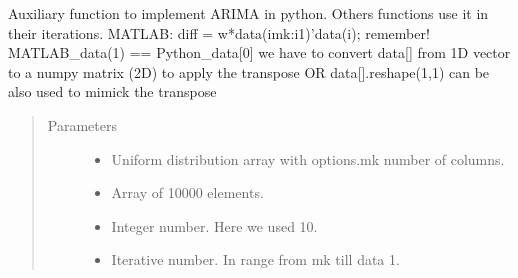 \documentclass[letterpaper,10pt,english]{sphinxmanual}
\begin{document}

\begin{fulllineitems}
\label{\detokenize{LDS:LDS.OnlineLDS_library.diff_calc}}
\sphinxAtStartPar
Auxiliary function to implement ARIMA in python. Others functions use it in their
iterations.
MATLAB: diff = w*data(i\sphinxhyphen{}mk:i\sphinxhyphen{}1)’\sphinxhyphen{}data(i);
remember! MATLAB\_data(1) == Python\_data{[}0{]}
we have to convert data{[}{]} from 1D vector to a numpy matrix (2D) to apply the transpose
OR data{[}{]}.reshape(\sphinxhyphen{}1,1) can be also used to mimick the transpose
\begin{quote}\begin{description}
\item[{Parameters}] \leavevmode\begin{itemize}
\item {} 
\sphinxAtStartPar
{} \textendash{} Uniform distribution array with options.mk number of columns.

\item {} 
\sphinxAtStartPar
{} \textendash{} Array of 10000 elements.

\item {} 
\sphinxAtStartPar
{} \textendash{} Integer number. Here we used 10.

\item {} 
\sphinxAtStartPar
{} \textendash{} Iterative number. In range from mk till data \sphinxhyphen{} 1.

\end{itemize}

\end{description}\end{quote}

\end{fulllineitems}

\end{document}
